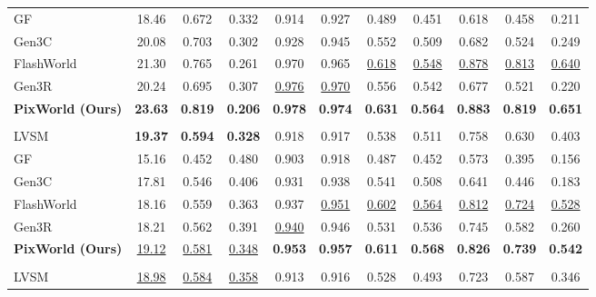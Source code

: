 \begin{table}[t]
{\begin{tabular}{l ccc cccc ccc}
GF~\citep{wu2025geometry}           & 18.46 & 0.672 & 0.332 & 0.914 & 0.927 & 0.489 & 0.451 & 0.618 & 0.458 & 0.211 \\
Gen3C~\citep{ren2025gen3c}          & 20.08 & 0.703 & 0.302 & 0.928 & 0.945 & 0.552 & 0.509 & 0.682 & 0.524 & 0.249 \\
FlashWorld~\citep{li2025flashworld} & 21.30 & 0.765 & 0.261 & 0.970 & 0.965 & \underline{0.618} & \underline{0.548} & \underline{0.878} & \underline{0.813} & \underline{0.640} \\
Gen3R~\citep{huang2026gen3r}        & 20.24 & 0.695 & 0.307 & \underline{0.976} & \underline{0.970} & 0.556 & 0.542 & 0.677 & 0.521 & 0.220 \\
\rowcolor{cyan!8}
\textbf{PixWorld (Ours)}           & \textbf{23.63} & \textbf{0.819} & \textbf{0.206} & \textbf{0.978} & \textbf{0.974} & \textbf{0.631} & \textbf{0.564} & \textbf{0.883} & \textbf{0.819} & \textbf{0.651} \\
\midrule
\rowcolor{gray!12}
\multicolumn{11}{l}{\textbf{DL3DV-10K}~~--~~2-view Interpolation} \\
LVSM~\citep{jinlvsm}                & \textbf{19.37} & \textbf{0.594} & \textbf{0.328} & 0.918 & 0.917 & 0.538 & 0.511 & 0.758 & 0.630 & 0.403 \\
GF~\citep{wu2025geometry}           & 15.16 & 0.452 & 0.480 & 0.903 & 0.918 & 0.487 & 0.452 & 0.573 & 0.395 & 0.156 \\
Gen3C~\citep{ren2025gen3c}          & 17.81 & 0.546 & 0.406 & 0.931 & 0.938 & 0.541 & 0.508 & 0.641 & 0.446 & 0.183 \\
FlashWorld~\citep{li2025flashworld} & 18.16 & 0.559 & 0.363 & 0.937 & \underline{0.951} & \underline{0.602} & \underline{0.564} & \underline{0.812} & \underline{0.724} & \underline{0.528} \\
Gen3R~\citep{huang2026gen3r}        & 18.21 & 0.562 & 0.391 & \underline{0.940} & 0.946 & 0.531 & 0.536 & 0.745 & 0.582 & 0.260 \\
\rowcolor{cyan!8}
\textbf{PixWorld (Ours)}           & \underline{19.12} & \underline{0.581} & \underline{0.348} & \textbf{0.953} & \textbf{0.957} & \textbf{0.611} & \textbf{0.568} & \textbf{0.826} & \textbf{0.739} & \textbf{0.542} \\
\midrule
\rowcolor{gray!12}
\multicolumn{11}{l}{\textbf{DL3DV-10K}~~--~~2-view Extrapolation} \\
LVSM~\citep{jinlvsm}                & \underline{18.98} & \underline{0.584} & \underline{0.358} & 0.913 & 0.916 & 0.528 & 0.493 & 0.723 & 0.587 & 0.346 \\

\end{tabular}}
\end{table}
